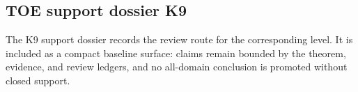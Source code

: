 \subsection{TOE support dossier K9}
The K9 support dossier records the review route for the corresponding level. It is included as a compact baseline surface: claims remain bounded by the theorem, evidence, and review ledgers, and no all-domain conclusion is promoted without closed support.
